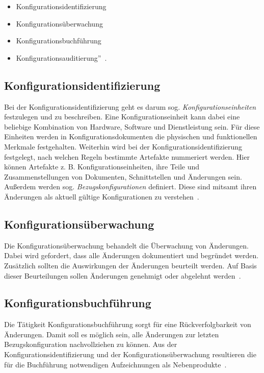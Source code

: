 \documentclass[runningheads,a4paper]{uwsese}
\begin{document}
\begin{itemize}
	\item Konfigurationsidentifizierung
	\item Konfigurationsüberwachung
	\item Konfigurationsbuchführung
	\item Konfigurationsauditierung''~\cite{ISO10007}.
\end{itemize}

\subsection{Konfigurationsidentifizierung}
Bei der Konfigurationsidentifizierung geht es darum sog.
{\em Konfigurationseinheiten} festzulegen und zu beschreiben. Eine
Konfigurationseinheit kann dabei eine beliebige Kombination von Hardware,
Software und Dienstleistung sein. Für diese Einheiten werden in
Konfigurationsdokumenten die physischen und funktionellen Merkmale festgehalten.
Weiterhin wird bei der Konfigurationsidentifizierung festgelegt, nach welchen
Regeln bestimmte Artefakte nummeriert werden. Hier können Artefakte z. B.
Konfigurationseinheiten, ihre Teile und Zusammenstellungen von Dokumenten,
Schnittstellen und Änderungen sein. Außerdem werden sog.
{\em Bezugskonfigurationen} definiert. Diese sind mitsamt ihren Änderungen als
aktuell gültige Konfigurationen zu verstehen~\cite[S. 6f]{weischedel2002}.

\subsection{Konfigurationsüberwachung}
Die Konfigurationsüberwachung behandelt die Überwachung von Änderungen. Dabei
wird gefordert, dass alle Änderungen dokumentiert und begründet werden.
Zusätzlich sollten die Auswirkungen der Änderungen beurteilt werden. Auf Basis
dieser Beurteilungen sollen Änderungen genehmigt oder abgelehnt
werden~\cite[S. 7]{weischedel2002}.

\subsection{Konfigurationsbuchführung}
Die Tätigkeit Konfigurationsbuchführung sorgt für eine Rückverfolgbarkeit von
Änderungen. Damit soll es möglich sein, alle Änderungen zur letzten
Bezugskonfiguration nachvollziehen zu können. Aus der
Konfigurationsidentifizierung und der Konfigurationsüberwachung resultieren
die für die Buchführung notwendigen Aufzeichnungen als
Nebenprodukte~\cite[S. 7]{weischedel2002}.
\end{document}
